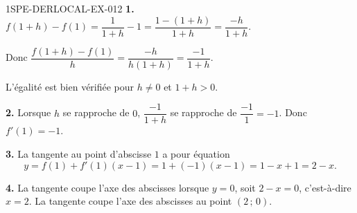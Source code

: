 \begin{corrige}{1SPE-DERLOCAL-EX-012}
\textbf{1.} $f(1+h)-f(1)=\dfrac{1}{1+h}-1=\dfrac{1-(1+h)}{1+h}=\dfrac{-h}{1+h}$.

Donc $\dfrac{f(1+h)-f(1)}{h}=\dfrac{-h}{h(1+h)}=\dfrac{-1}{1+h}$.

L'égalité est bien vérifiée pour $h\ne 0$ et $1+h>0$.

\textbf{2.} Lorsque $h$ se rapproche de $0$, $\dfrac{-1}{1+h}$ se rapproche de $\dfrac{-1}{1}=-1$. Donc $f'(1)=-1$.

\textbf{3.} La tangente au point d'abscisse $1$ a pour équation
\[
y=f(1)+f'(1)(x-1)=1+(-1)(x-1)=1-x+1=2-x.
\]

\textbf{4.} La tangente coupe l'axe des abscisses lorsque $y=0$, soit $2-x=0$, c'est-à-dire $x=2$. La tangente coupe l'axe des abscisses au point $(2\,;\,0)$.
\end{corrige}
